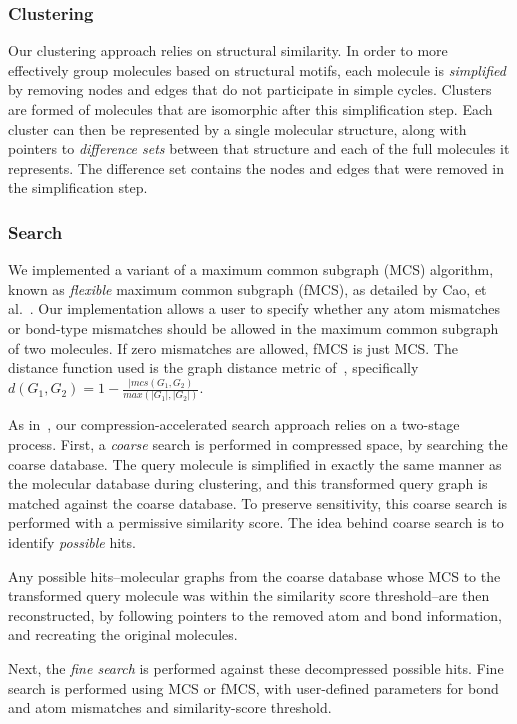 \documentclass[review,preprint,12pt]{elsarticle}
\renewcommand{\cite}{\citep} %
\theoremstyle{definition}
\theoremstyle{remark}
\numberwithin{equation}{section}
\begin{document}
\subsubsection{Clustering}


Our clustering approach relies on structural similarity.
In order to more effectively group molecules based on structural motifs,
each molecule is \emph{simplified} by removing nodes and edges that do not
participate in simple cycles.
Clusters are formed of molecules that are isomorphic after this simplification
step.
Each cluster can then be represented by a single molecular structure, along 
with pointers to \emph{difference sets} between that structure and each of the 
full molecules it represents.
The difference set contains the nodes and edges that were removed in the 
simplification step.

\subsubsection{Search}

We implemented a variant of a maximum common subgraph (MCS) algorithm, known as 
\emph{flexible} maximum
common subgraph (fMCS), as detailed by Cao, et al.~\cite{cao}.
Our implementation allows a user to specify whether any atom mismatches or 
bond-type mismatches should be 
allowed in the maximum common subgraph of two molecules.
If zero mismatches are allowed, fMCS is just MCS.
The distance function used is the graph distance metric of~\cite{bunke:1998},
specifically $d(G_1,G_2) = 1 - \frac{|mcs(G_1,G_2)}{max(|G_1|,|G_2|)}$.

As in~\cite{loh2012compressive}, our compression-accelerated search approach 
relies on a two-stage process.
First, a \emph{coarse} search is performed in compressed space, by searching 
the coarse database.
The query molecule is simplified in exactly the same manner as 
the molecular database during clustering, and this transformed query graph is 
matched against the coarse database.
To preserve sensitivity, this coarse search is performed with a permissive 
similarity score.
The idea behind coarse search is to identify \emph{possible} hits.


Any possible hits--molecular graphs from the coarse database whose MCS to 
the transformed query molecule was within the similarity score threshold--are 
then reconstructed, by following
pointers to the removed atom and bond information, and recreating the 
original molecules.

Next, the \emph{fine search} is performed against these decompressed possible 
hits.
Fine search is performed using MCS or fMCS, with user-defined parameters for 
bond and atom mismatches and similarity-score threshold.
\end{document}
